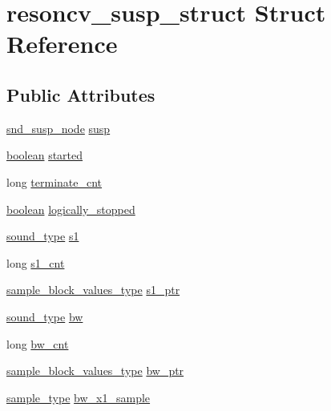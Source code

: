 \hypertarget{structresoncv__susp__struct}{}\section{resoncv\+\_\+susp\+\_\+struct Struct Reference}
\label{structresoncv__susp__struct}
\subsection*{Public Attributes}
\begin{DoxyCompactItemize}
\item 
\hyperlink{sound_8h_a6b268203688a934bd798ceb55f85d4c0}{snd\+\_\+susp\+\_\+node} \hyperlink{structresoncv__susp__struct_a408f0059521816c74f91b37621c892ae}{susp}
\item 
\hyperlink{cext_8h_a7670a4e8a07d9ebb00411948b0bbf86d}{boolean} \hyperlink{structresoncv__susp__struct_ab91e6bc2f41a3ce497159a5f47e2ec9a}{started}
\item 
long \hyperlink{structresoncv__susp__struct_aec9c30b4629ecdd7a51272ab88bca9c5}{terminate\+\_\+cnt}
\item 
\hyperlink{cext_8h_a7670a4e8a07d9ebb00411948b0bbf86d}{boolean} \hyperlink{structresoncv__susp__struct_a53b3ab376586d9a3488f596cfb0a1c8e}{logically\+\_\+stopped}
\item 
\hyperlink{sound_8h_a792cec4ed9d6d636d342d9365ba265ea}{sound\+\_\+type} \hyperlink{structresoncv__susp__struct_a12e15affd09ec398744ee0b4b9c9cef4}{s1}
\item 
long \hyperlink{structresoncv__susp__struct_a606045473d8e6719350e1c16c9047bd4}{s1\+\_\+cnt}
\item 
\hyperlink{sound_8h_a83d17f7b465d1591f27cd28fc5eb8a03}{sample\+\_\+block\+\_\+values\+\_\+type} \hyperlink{structresoncv__susp__struct_aa9b69741aad583a0cae82986f0403da2}{s1\+\_\+ptr}
\item 
\hyperlink{sound_8h_a792cec4ed9d6d636d342d9365ba265ea}{sound\+\_\+type} \hyperlink{structresoncv__susp__struct_aad00b789b4b54c0ae213122ded46f75e}{bw}
\item 
long \hyperlink{structresoncv__susp__struct_a4b3e7e484e6d898e3fd357220621976a}{bw\+\_\+cnt}
\item 
\hyperlink{sound_8h_a83d17f7b465d1591f27cd28fc5eb8a03}{sample\+\_\+block\+\_\+values\+\_\+type} \hyperlink{structresoncv__susp__struct_a43fae13b4d6ce1c27a17089392321b14}{bw\+\_\+ptr}
\item 
\hyperlink{sound_8h_a3a9d1d4a1c153390d2401a6e9f71b32c}{sample\+\_\+type} \hyperlink{structresoncv__susp__struct_a9a787db7571579b05b957be71cb733f3}{bw\+\_\+x1\+\_\+sample}

\end{DoxyCompactItemize}
